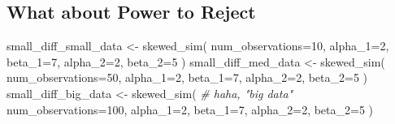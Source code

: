 \documentclass[
]{book}
\newenvironment{Shaded}{\begin{snugshade}}{\end{snugshade}}
\newcommand{\AttributeTok}[1]{\textcolor[rgb]{0.77,0.63,0.00}{#1}}
\newcommand{\CommentTok}[1]{\textcolor[rgb]{0.56,0.35,0.01}{\textit{#1}}}
\newcommand{\DecValTok}[1]{\textcolor[rgb]{0.00,0.00,0.81}{#1}}
\newcommand{\FunctionTok}[1]{\textcolor[rgb]{0.00,0.00,0.00}{#1}}
\newcommand{\NormalTok}[1]{#1}
\newcommand{\OtherTok}[1]{\textcolor[rgb]{0.56,0.35,0.01}{#1}}
\theoremstyle{definition}
\theoremstyle{definition}
\theoremstyle{definition}
\theoremstyle{definition}
\theoremstyle{remark}
\begin{document}
\hypertarget{what-about-power-to-reject}{%
\subsection{What about Power to Reject}\label{what-about-power-to-reject}}

\begin{Shaded}
\begin{Highlighting}[]
\NormalTok{small\_diff\_small\_data }\OtherTok{\textless{}{-}} \FunctionTok{skewed\_sim}\NormalTok{(}
  \AttributeTok{num\_observations=}\DecValTok{10}\NormalTok{, }
  \AttributeTok{alpha\_1=}\DecValTok{2}\NormalTok{, }\AttributeTok{beta\_1=}\DecValTok{7}\NormalTok{, }
  \AttributeTok{alpha\_2=}\DecValTok{2}\NormalTok{, }\AttributeTok{beta\_2=}\DecValTok{5}
\NormalTok{  )}
\NormalTok{small\_diff\_med\_data }\OtherTok{\textless{}{-}} \FunctionTok{skewed\_sim}\NormalTok{(}
  \AttributeTok{num\_observations=}\DecValTok{50}\NormalTok{, }
  \AttributeTok{alpha\_1=}\DecValTok{2}\NormalTok{, }\AttributeTok{beta\_1=}\DecValTok{7}\NormalTok{, }
  \AttributeTok{alpha\_2=}\DecValTok{2}\NormalTok{, }\AttributeTok{beta\_2=}\DecValTok{5}
\NormalTok{  )}
\NormalTok{small\_diff\_big\_data }\OtherTok{\textless{}{-}} \FunctionTok{skewed\_sim}\NormalTok{( }\CommentTok{\# haha, "big data"}
  \AttributeTok{num\_observations=}\DecValTok{100}\NormalTok{, }
  \AttributeTok{alpha\_1=}\DecValTok{2}\NormalTok{, }\AttributeTok{beta\_1=}\DecValTok{7}\NormalTok{, }
  \AttributeTok{alpha\_2=}\DecValTok{2}\NormalTok{, }\AttributeTok{beta\_2=}\DecValTok{5}
\NormalTok{  )}
\end{Highlighting}
\end{Shaded}
\end{document}
